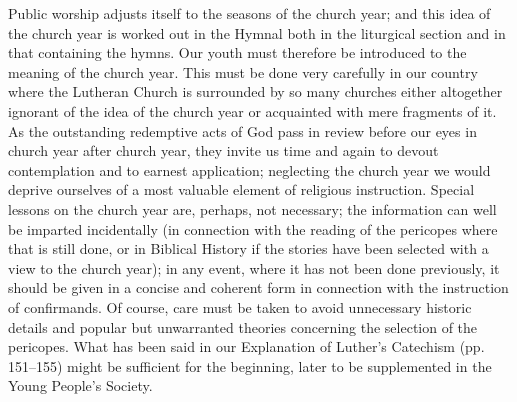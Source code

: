 Public worship adjusts itself to the seasons of the church year; and this idea of the church year is worked out in the Hymnal both in the liturgical section and in that containing the hymns. Our youth must therefore be introduced to the
meaning of the church year. This must be done very carefully in our country where the Lutheran Church is surrounded by so many churches either altogether ignorant of the idea of the church year or acquainted with mere fragments of it. As the outstanding redemptive acts of God pass in review before our eyes in church year after church year, they invite us time and again to devout contemplation and to earnest application; neglecting the church year we would deprive ourselves of a most valuable element of religious instruction. Special lessons on the church year are, perhaps, not necessary; the information can well be imparted incidentally (in connection with the reading of the pericopes where that is still done, or in Biblical History if the stories have been selected with a view to the church year); in any event, where it has not been done previously, it should be given in a concise and coherent form in connection with the instruction of confirmands. Of course, care must be taken to avoid unnecessary historic details and popular but unwarranted theories concerning the selection of the pericopes. What has been said in our Explanation of Luther's Catechism (pp. 151–155) might be sufficient for the beginning, later to be supplemented in the Young People's Society.


